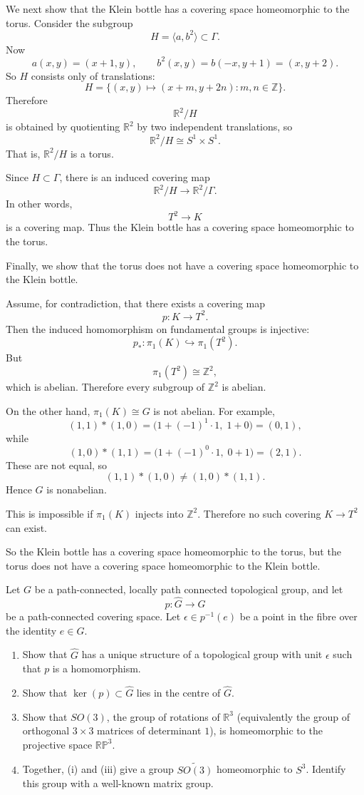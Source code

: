 \begin{solution}
We next show that the Klein bottle has a covering space homeomorphic to the torus. Consider the subgroup
\[
H=\langle a,b^2\rangle\subset \Gamma.
\]
Now
\[
a(x,y)=(x+1,y),
\qquad
b^2(x,y)=b(-x,y+1)=(x,y+2).
\]
So \(H\) consists only of translations:
\[
H=\{(x,y)\mapsto(x+m,y+2n):m,n\in\mathbb Z\}.
\]
Therefore
\[
\mathbb R^2/H
\]
is obtained by quotienting \(\mathbb R^2\) by two independent translations, so
\[
\mathbb R^2/H\cong S^1\times S^1.
\]
That is, \(\mathbb R^2/H\) is a torus.

Since \(H\subset \Gamma\), there is an induced covering map
\[
\mathbb R^2/H \to \mathbb R^2/\Gamma.
\]
In other words,
\[
T^2\to K
\]
is a covering map. Thus the Klein bottle has a covering space homeomorphic to the torus.

Finally, we show that the torus does not have a covering space homeomorphic to the Klein bottle.

Assume, for contradiction, that there exists a covering map
\[
p:K\to T^2.
\]
Then the induced homomorphism on fundamental groups is injective:
\[
p_*:\pi_1(K)\hookrightarrow \pi_1(T^2).
\]
But
\[
\pi_1(T^2)\cong \mathbb Z^2,
\]
which is abelian. Therefore every subgroup of \(\mathbb Z^2\) is abelian.

On the other hand, \(\pi_1(K)\cong G\) is not abelian. For example,
\[
(1,1)*(1,0)=\bigl(1+(-1)^1\cdot 1,\;1+0\bigr)=(0,1),
\]
while
\[
(1,0)*(1,1)=\bigl(1+(-1)^0\cdot 1,\;0+1\bigr)=(2,1).
\]
These are not equal, so
\[
(1,1)*(1,0)\neq (1,0)*(1,1).
\]
Hence \(G\) is nonabelian.

This is impossible if \(\pi_1(K)\) injects into \(\mathbb Z^2\). Therefore no such covering \(K\to T^2\) can exist.

So the Klein bottle has a covering space homeomorphic to the torus, but the torus does not have a covering space homeomorphic to the Klein bottle.
\end{solution}

\begin{problem}
Let \(G\) be a path-connected, locally path connected topological group, and let
\[
p:\widehat{G}\to G
\]
be a path-connected covering space. Let \(\epsilon\in p^{-1}(e)\) be a point in the fibre over the identity \(e\in G\).

\begin{enumerate}
	\item[(i)] Show that \(\widehat{G}\) has a unique structure of a topological group with unit \(\epsilon\) such that \(p\) is a homomorphism.
	\item[(ii)] Show that \(\ker(p)\subset \widehat{G}\) lies in the centre of \(\widehat{G}\).
	\item[(iii)] Show that \(SO(3)\), the group of rotations of \(\mathbb R^3\) (equivalently the group of orthogonal \(3\times 3\) matrices of determinant \(1\)), is homeomorphic to the projective space \(\mathbb{RP}^3\).
	\item[(iv)] Together, (i) and (iii) give a group \(\widetilde{SO(3)}\) homeomorphic to \(S^3\). Identify this group with a well-known matrix group.
\end{enumerate}
\end{problem}

